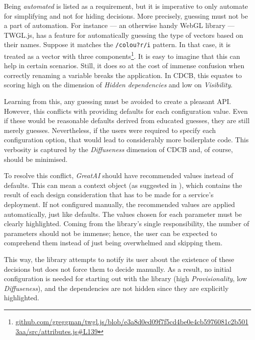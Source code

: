 Being \textit{automated} is listed as a requirement, but it is imperative to only automate for simplifying and not for hiding decisions. More precisely, guessing must not be a part of automation. For instance --- an otherwise handy WebGL library --- TWGL.js, has a feature for automatically guessing the type of vectors based on their names. Suppose it matches the \texttt{/colou?r/i} pattern. In that case, it is treated as a vector with three components\footnote{\href{https://github.com/greggman/twgl.js/blob/e3a8d0ed09f7f5cd4be0e4cb5976081c2b5013aa/src/attributes.js\#L139}{\tiny github.com/greggman/twgl.js/blob/e3a8d0ed09f7f5cd4be0e4cb5976081c2b5013aa/src/attributes.js\#L139}}. It is easy to imagine that this can help in certain scenarios. Still, it does so at the cost of immense confusion when correctly renaming a variable breaks the application. In CDCB, this equates to scoring high on the dimension of \textit{Hidden dependencies} and low on \textit{Visibility}.

Learning from this, any guessing must be avoided to create a pleasant API. However, this conflicts with providing defaults for each configuration value. Even if these would be reasonable defaults derived from educated guesses, they are still merely guesses. Nevertheless, if the users were required to specify each configuration option, that would lead to considerably more boilerplate code. This verbosity is captured by the \textit{Diffuseness} dimension of CDCB and, of course, should be minimised.

To resolve this conflict, \textit{GreatAI} should have recommended values instead of defaults. This can mean a context object (as suggested in \cite{ousterhout2018philosophy}), which contains the result of each design consideration that has to be made for a service's deployment. If not configured manually, the recommended values are applied automatically, just like defaults. The values chosen for each parameter must be clearly highlighted. Coming from the library's single responsibility, the number of parameters should not be immense; hence, the user can be expected to comprehend them instead of just being overwhelmed and skipping them.

This way, the library attempts to notify its user about the existence of these decisions but does not force them to decide manually. As a result, no initial configuration is needed for starting out with the library (high \textit{Provisionality}, low \textit{Diffuseness}), and the dependencies are not hidden since they are explicitly highlighted.

